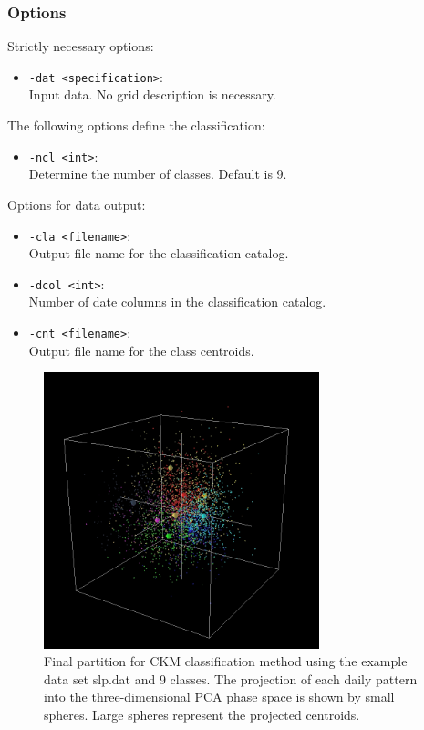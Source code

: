 \documentclass[12pt, oneside, a4paper, headsepline, plainheadsepline]{scrbook}
\begin{document}
\subsubsection*{Options}
Strictly necessary options:
\begin{itemize}
 \item \verb+-dat <specification>+:\\ Input data. No grid description is necessary.
\end{itemize}
The following options define the classification:
\begin{itemize}
 \item \verb+-ncl <int>+:\\ Determine the number of classes. Default is 9.
\end{itemize}
Options for data output:
\begin{itemize}
 \item \verb+-cla <filename>+:\\ Output file name for the classification catalog.
 \item \verb+-dcol <int>+:\\ Number of date columns in the classification catalog.
 \item \verb+-cnt <filename>+:\\ Output file name for the class centroids.
\end{itemize}
%
\begin{figure}[h]
\centering
\includegraphics[width=8cm]{ckm02.png}
\caption{Final partition for CKM classification method using the example data set slp.dat and 9 classes. 
The projection of each daily pattern into the three-dimensional PCA phase space is shown by small spheres. Large spheres represent the projected centroids.}
\label{fig:ckmean02}
\end{figure}
%
\end{document}
